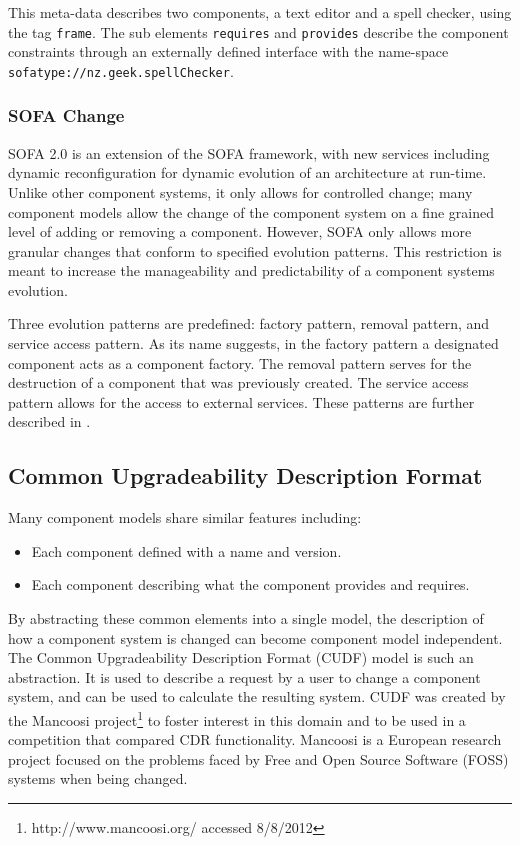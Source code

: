 This meta-data describes two components, a text editor and a spell checker, using the tag \texttt{frame}.
The sub elements \texttt{requires} and \texttt{provides} describe the component constraints through an externally defined interface with the name-space \texttt{sofatype://nz.geek.spellChecker}.

\subsubsection{SOFA Change}
SOFA 2.0 is an extension of the SOFA framework, with new services including dynamic reconfiguration for dynamic evolution of an architecture at run-time. 
Unlike other component systems,
it only allows for controlled change; 
many component models allow the change of the component system on a fine grained level of adding or removing a component.
However, SOFA only allows more granular changes that  conform to specified evolution patterns.
This restriction is meant to increase the manageability and predictability of a component systems evolution. 

Three evolution patterns are predefined: factory pattern, removal pattern, and service access pattern.
As its name suggests, in the factory pattern a designated component acts as a component factory. 
The removal pattern serves for the destruction of a component that was previously created.
The service access pattern allows for the access to external services.
These patterns are further described in \citep{Hnetynka2006}.


\subsection{Common Upgradeability Description Format}
Many component models share similar features including:
\begin{itemize}
  \item Each component defined with a name and version.
  \item Each component describing what the component provides and requires.
\end{itemize} 

By abstracting these common elements into a single model, the description of how a component system is changed can become component model independent.
The Common Upgradeability Description Format (CUDF) model is such an abstraction.
It is used to describe a request by a user to change a component system, and can be used to calculate the resulting system.
CUDF was created by the Mancoosi project\footnote{http://www.mancoosi.org/ accessed 8/8/2012} to foster interest in this domain and to be used in a competition that compared CDR functionality.
Mancoosi is a European research project focused on the problems faced by Free and Open Source Software (FOSS) systems when being changed.

